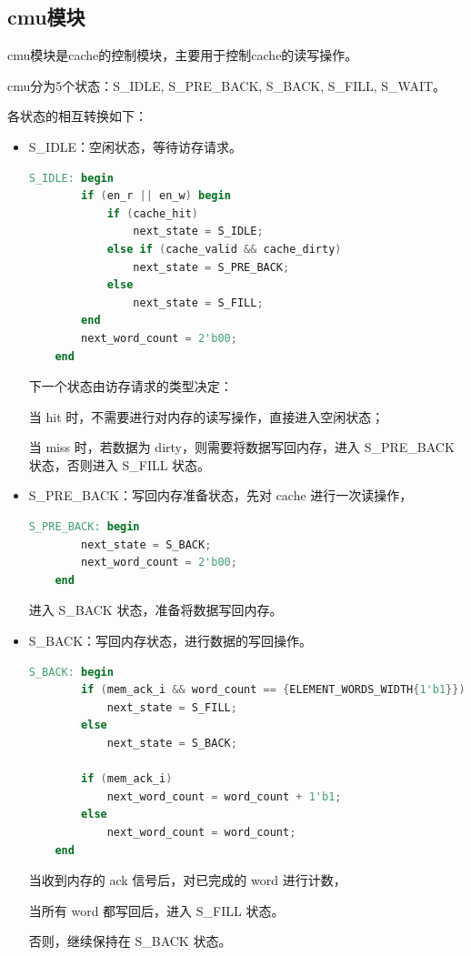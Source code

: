 \documentclass{article}
\begin{document}
\subsection{cmu模块}
cmu模块是cache的控制模块，主要用于控制cache的读写操作。\par
cmu分为5个状态：S\_IDLE, S\_PRE\_BACK, S\_BACK, S\_FILL, S\_WAIT。\par
各状态的相互转换如下：\par
\begin{itemize}
    \item S\_IDLE：空闲状态，等待访存请求。
    \begin{lstlisting}[language=Verilog]
    S_IDLE: begin
        if (en_r || en_w) begin
            if (cache_hit)
                next_state = S_IDLE;
            else if (cache_valid && cache_dirty)
                next_state = S_PRE_BACK;
            else
                next_state = S_FILL;
        end
        next_word_count = 2'b00;
    end
    \end{lstlisting}
    下一个状态由访存请求的类型决定：\par
    当 hit 时，不需要进行对内存的读写操作，直接进入空闲状态；\par
    当 miss 时，若数据为 dirty，则需要将数据写回内存，进入 S\_PRE\_BACK 状态，否则进入 S\_FILL 状态。\par

    \item S\_PRE\_BACK：写回内存准备状态，先对 cache 进行一次读操作，\par
    \begin{lstlisting}[language=Verilog]
    S_PRE_BACK: begin
        next_state = S_BACK;
        next_word_count = 2'b00;
    end
    \end{lstlisting}
    进入 S\_BACK 状态，准备将数据写回内存。\par

    \item S\_BACK：写回内存状态，进行数据的写回操作。\par
    \begin{lstlisting}[language=Verilog]
    S_BACK: begin
        if (mem_ack_i && word_count == {ELEMENT_WORDS_WIDTH{1'b1}})    // wrote back all words, 1 cache line = 4 words
            next_state = S_FILL;
        else
            next_state = S_BACK;

        if (mem_ack_i)
            next_word_count = word_count + 1'b1;
        else
            next_word_count = word_count;
    end
    \end{lstlisting}
    当收到内存的 ack 信号后，对已完成的 word 进行计数，\par
    当所有 word 都写回后，进入 S\_FILL 状态。\par
    否则，继续保持在 S\_BACK 状态。\par


\end{itemize}
\end{document}
